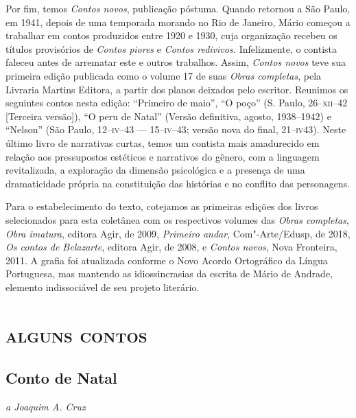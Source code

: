 Por fim, temos \emph{Contos novos}, publicação póstuma. Quando retornou
a São Paulo, em 1941, depois de uma temporada morando no Rio de Janeiro,
Mário começou a trabalhar em contos produzidos entre 1920 e 1930, cuja
organização recebeu os títulos provisórios de \emph{Contos piores} e
\emph{Contos redivivos.} Infelizmente, o contista faleceu antes de
arrematar este e outros trabalhos. Assim, \emph{Contos novos} teve sua
primeira edição publicada como o volume 17 de suas \emph{Obras
completas}, pela Livraria Martins Editora, a partir dos planos deixados
pelo escritor. Reunimos os seguintes contos nesta edição: ``Primeiro de
maio'', ``O poço'' (S. Paulo, 26--\textsc{xii}--42 {[}Terceira versão{]}), ``O peru
de Natal'' (Versão definitiva, agosto, 1938--1942) e ``Nelson'' (São
Paulo, 12--\textsc{iv}--43 --- 15--\textsc{iv}--43; versão nova do final, 21--\textsc{iv}43). %
Neste
último livro de narrativas curtas, temos um contista mais amadurecido em
relação aos pressupostos estéticos e narrativos do gênero, com a
linguagem revitalizada, a exploração da dimensão psicológica e a
presença de uma dramaticidade própria na constituição das histórias e no
conflito das personagens.

Para o estabelecimento do texto, cotejamos as primeiras edições dos
livros selecionados para esta coletânea com os respectivos volumes das
\emph{Obras completas}, \emph{Obra imatura}, editora Agir, de 2009,
\emph{Primeiro andar}, Com"-Arte/Edusp, de 2018, \emph{Os contos de
Belazarte}, editora Agir, de 2008, e \emph{Contos novos}, Nova
Fronteira, 2011. A grafia foi atualizada conforme o Novo Acordo
Ortográfico da Língua Portuguesa, mas mantendo as idiossincrasias da
escrita de Mário de Andrade, elemento indissociável de seu projeto
literário.

\part{\textsc{alguns contos}}

\chapter{Conto de Natal}

\hfill{}\emph{a Joaquim A. Cruz}\bigskip

